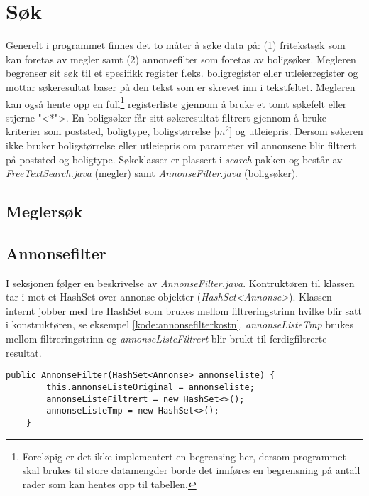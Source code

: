 \section{Søk} \label{sec:sok}
Generelt i programmet finnes det to måter å søke data på: (1) fritekstsøk som kan foretas av megler samt (2) annonsefilter som foretas av boligsøker. Megleren begrenser sit søk til et spesifikk register f.eks. boligregister eller utleierregister og mottar søkeresultat baser på den tekst som er skrevet inn i tekstfeltet. Megleren kan også hente opp en full\footnote{Foreløpig er det ikke implementert en begrensing her, dersom programmet skal brukes til store datamengder borde det innføres en begrensning på antall rader som kan hentes opp til tabellen.} registerliste gjennom å bruke et tomt søkefelt eller stjerne "<*">. 
En boligsøker får sitt søkeresultat filtrert gjennom å bruke kriterier som poststed, boligtype, boligstørrelse [$m^2$] og utleiepris. Dersom søkeren ikke bruker boligstørrelse eller utleiepris om parameter vil annonsene blir filtrert på poststed og boligtype.
Søkeklasser er plassert i \emph{search} pakken og består av \emph{FreeTextSearch.java} (megler) samt \emph{AnnonseFilter.java} (boligsøker).
\subsection{Meglersøk}
\subsection{Annonsefilter}
I seksjonen følger en beskrivelse av \emph{AnnonseFilter.java}. Kontruktøren til klassen tar i mot et HashSet over annonse objekter (\emph{HashSet<Annonse>}). Klassen internt jobber med tre HashSet som brukes mellom filtreringstrinn hvilke blir satt i konstruktøren, se eksempel \ref{kode:annonsefilterkostn}. \emph{annonseListeTmp} brukes mellom filtreringstrinn og \emph{annonseListeFiltrert} blir brukt til ferdigfiltrerte resultat.  

\begin{lstlisting}[caption=AnnonseFilter.java: Konstruktør, label=kode:annonsefilterkostn]
    public AnnonseFilter(HashSet<Annonse> annonseliste) {
        this.annonseListeOriginal = annonseliste;
        annonseListeFiltrert = new HashSet<>();
        annonseListeTmp = new HashSet<>();
    }
\end{lstlisting}

